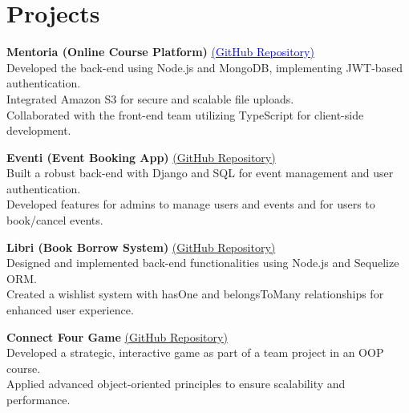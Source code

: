 \documentclass[a4paper,10pt]{article}
\begin{document}

\section*{Projects}
\textbf{Mentoria (Online Course Platform)} \href{https://github.com/YassenAli/Mentoria}{\textcolor{blue}{(GitHub Repository)}}  \\      
\textbullet{}\hspace{2mm} Developed the back-end using Node.js and MongoDB, implementing JWT-based authentication.  \\  
\textbullet{}\hspace{2mm} Integrated Amazon S3 for secure and scalable file uploads.  \\  
\textbullet{}\hspace{2mm} Collaborated with the front-end team utilizing TypeScript for client-side development.  

\textbf{Eventi (Event Booking App)} \href{https://github.com/YassenAli/Event-System}{(GitHub Repository)}  \\
\textbullet{}\hspace{2mm} Built a robust back-end with Django and SQL for event management and user authentication.  \\
\textbullet{}\hspace{2mm} Developed features for admins to manage users and events and for users to book/cancel events.

\textbf{Libri (Book Borrow System)} \href{https://github.com/YassenAli/Libri}{(GitHub Repository)}  \\
\textbullet{}\hspace{2mm} Designed and implemented back-end functionalities using Node.js and Sequelize ORM.  \\
\textbullet{}\hspace{2mm} Created a wishlist system with hasOne and belongsToMany relationships for enhanced user experience.

\textbf{Connect Four Game} \href{https://github.com/YassenAli/XO-Game-by-CPP}{(GitHub Repository)}  \\
\textbullet{}\hspace{2mm} Developed a strategic, interactive game as part of a team project in an OOP course.  \\
\textbullet{}\hspace{2mm} Applied advanced object-oriented principles to ensure scalability and performance.
\end{document}
